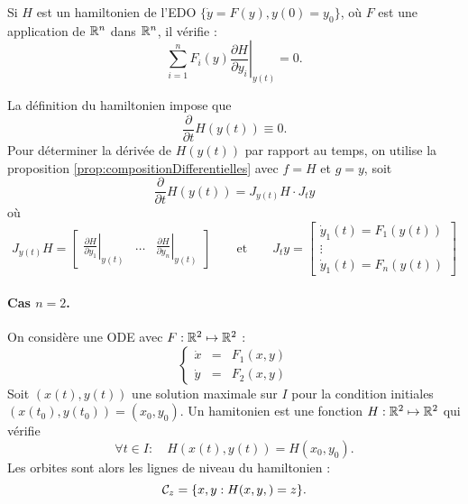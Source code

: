 \bigskip
\begin{proposition}[Hamiltionien] \label{prop:hamiltonien}
  Si $H$ est un hamiltonien de l'EDO $\{\dot y = F(y), y(0) = y_0\}$, où $F$ est une application de $\mathbb{R}^n$ dans $\mathbb{R}^n$, il vérifie :
  $$
  \sum_{i=1}^n F_i(y) \left.\frac{\partial H}{\partial y_i}\right|_{y(t)} = 0.
  $$
\end{proposition}

  La définition du hamiltonien impose que 
  $$
  \frac{\partial}{\partial t} H(y(t)) \equiv 0.
  $$
  Pour déterminer la dérivée de $H(y(t))$ par rapport au temps, on utilise la proposition \ref{prop:compositionDifferentielles} avec $f = H$ et $g = y$, soit
  $$
  \frac{\partial}{\partial t} H(y(t)) 
  = J_{y(t)}H \cdot J_ty
  $$
  où
  $$
  J_{y(t)}H = \left[ \begin{array}{ccc}
    \displaystyle{\left.\frac{\partial H}{\partial y_1}\right|_{y(t)}} & 
    \dots & 
    \displaystyle{\left.\frac{\partial H}{\partial y_n}\right|_{y(t)}} 
  \end{array}\right] 
  \qquad \text{et} \qquad 
  J_ty = \left[\begin{array}{c} 
    \dot y_1(t) = F_1(y(t)) \\
    \vdots \\
    \dot y_1(t) = F_n(y(t))
  \end{array}\right] 
  $$
\eproof

\paragraph*{Cas $n = 2$.} 
On considère une ODE avec $F : \mathbb{R}^2 \mapsto \mathbb{R}^2$ : 
$$
\left\{\begin{array}{rcl} \dot x & = & F_1(x, y) \\ \dot y & = & F_2(x, y) \end{array}\right.
$$
Soit $(x(t), y(t))$ une solution maximale sur $I$ pour la condition initiales $(x(t_0), y(t_0)) = (x_0, y_0)$. Un hamitonien est une fonction $H : \mathbb{R}^2 \mapsto \mathbb{R}^2$ qui vérifie
$$
\forall t \in I: \quad H(x(t), y(t)) = H(x_0, y_0).
$$
Les orbites sont alors les lignes de niveau du hamiltonien : 
$$
\mathcal{C}_z = \{x, y: H(x, y, ) = z\}.
$$

